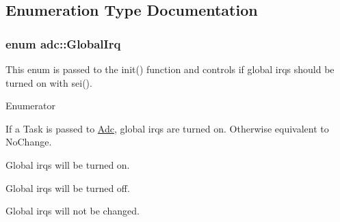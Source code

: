\subsection{Enumeration Type Documentation}
\subsubsection[{\texorpdfstring{Global\+Irq}{GlobalIrq}}]{\setlength{\rightskip}{0pt plus 5cm}enum {\bf adc\+::\+Global\+Irq}\hspace{0.3cm}{\ttfamily [strong]}}\hypertarget{namespaceadc_a92c3b192926a98ab7106f26c73bf85bb}{}\label{namespaceadc_a92c3b192926a98ab7106f26c73bf85bb}


This enum is passed to the {\ttfamily init()} function and controls if global irqs should be turned on with {\ttfamily sei()}. 

\begin{Desc}
\item[Enumerator]\par
\begin{description}
\item[{\em 
Auto\hypertarget{namespaceadc_a92c3b192926a98ab7106f26c73bf85bba06b9281e396db002010bde1de57262eb}{}\label{namespaceadc_a92c3b192926a98ab7106f26c73bf85bba06b9281e396db002010bde1de57262eb}
}]If a {\ttfamily Task} is passed to {\ttfamily \hyperlink{classadc_1_1Adc}{Adc}}, global irqs are turned on. Otherwise equivalent to {\ttfamily No\+Change}. \item[{\em 
Turn\+On\hypertarget{namespaceadc_a92c3b192926a98ab7106f26c73bf85bbace5a9f99f26d20a3bb29810a8716ae11}{}\label{namespaceadc_a92c3b192926a98ab7106f26c73bf85bbace5a9f99f26d20a3bb29810a8716ae11}
}]Global irqs will be turned on. \item[{\em 
Turn\+Off\hypertarget{namespaceadc_a92c3b192926a98ab7106f26c73bf85bbaf0635e226d94e6a8339e6f237c2b6f1b}{}\label{namespaceadc_a92c3b192926a98ab7106f26c73bf85bbaf0635e226d94e6a8339e6f237c2b6f1b}
}]Global irqs will be turned off. \item[{\em 
No\+Change\hypertarget{namespaceadc_a92c3b192926a98ab7106f26c73bf85bba4bac8cdf0a968472b519b3b295d0d48b}{}\label{namespaceadc_a92c3b192926a98ab7106f26c73bf85bba4bac8cdf0a968472b519b3b295d0d48b}
}]Global irqs will not be changed. \end{description}
\end{Desc}
